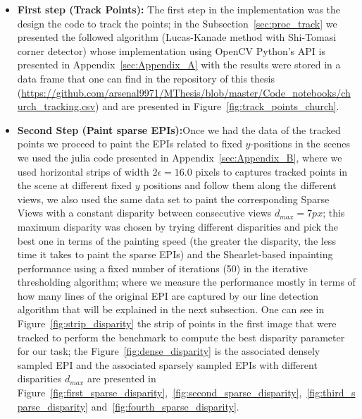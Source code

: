 \bigskip

\begin{itemize}

\item \textbf{First step (Track Points):} The first step in the implementation was the design the code to track the points; in the Subsection~\ref{sec:proc_track} we presented the followed algorithm (Lucas-Kanade method with Shi-Tomasi corner detector) whose implementation using OpenCV Python's API is presented in Appendix~\ref{sec:Appendix_A} with the results were stored in a data frame that one can find in the repository of this thesis (\url{https://github.com/arsenal9971/MThesis/blob/master/Code_notebooks/church_tracking.csv}) and are presented in Figure~\ref{fig:track_points_church}.

\bigskip

\item \textbf{Second Step (Paint sparse EPIs):}Once we had the data of the tracked points we proceed to paint the EPIs related to fixed $y$-positions in the scenes we used the julia code presented in Appendix~\ref{sec:Appendix_B}, where we used horizontal strips of width $2\epsilon=16.0$ pixels to captures tracked points in the scene at different fixed $y$ positions and follow them along the different views, we also used the same data set to paint the corresponding Sparse Views with a constant disparity between consecutive views $d_{max}=7px$; this maximum disparity was chosen by trying different disparities and pick the best one in terms of the painting speed (the greater the disparity, the less time it takes to paint the sparse EPIs) and the Shearlet-based inpainting performance using a fixed number of iterations (50) in the iterative thresholding algorithm; where we measure the performance mostly in terms of how many lines of the original EPI are captured by our line detection algorithm that will be explained in the next subsection. One can see in Figure~\ref{fig:strip_disparity} the strip of points in the first image that were tracked to perform the benchmark to compute the best disparity parameter for our task; the Figure~\ref{fig:dense_disparity} is the associated densely sampled EPI and the associated sparsely sampled EPIs with different disparities $d_{max}$ are presented in Figure~\ref{fig:first_sparse_disparity},~\ref{fig:second_sparse_disparity},~\ref{fig:third_sparse_disparity} and~\ref{fig:fourth_sparse_disparity}. 

\bigskip


\end{itemize}
